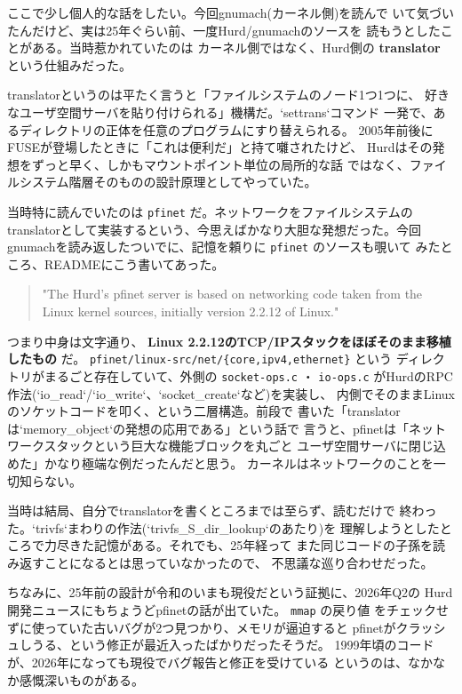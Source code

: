 \documentclass[11pt]{article}
\begin{document}
ここで少し個人的な話をしたい。今回gnumach(カーネル側)を読んで
いて気づいたんだけど、実は25年ぐらい前、一度Hurd/gnumachのソースを
読もうとしたことがある。当時惹かれていたのは
カーネル側ではなく、Hurd側の \textbf{translator} という仕組みだった。

translatorというのは平たく言うと「ファイルシステムのノード1つ1つに、
好きなユーザ空間サーバを貼り付けられる」機構だ。`settrans`コマンド
一発で、あるディレクトリの正体を任意のプログラムにすり替えられる。
2005年前後にFUSEが登場したときに「これは便利だ」と持て囃されたけど、
Hurdはその発想をずっと早く、しかもマウントポイント単位の局所的な話
ではなく、ファイルシステム階層そのものの設計原理としてやっていた。

当時特に読んでいたのは \texttt{pfinet} だ。ネットワークをファイルシステムの
translatorとして実装するという、今思えばかなり大胆な発想だった。今回
gnumachを読み返したついでに、記憶を頼りに \texttt{pfinet} のソースも覗いて
みたところ、READMEにこう書いてあった。

\begin{quote}
"The Hurd's pfinet server is based on networking code taken from the
Linux kernel sources, initially version 2.2.12 of Linux."
\end{quote}

つまり中身は文字通り、 \textbf{Linux 2.2.12のTCP/IPスタックをほぼそのまま移植したもの} だ。
\texttt{pfinet/linux-src/net/\{core,ipv4,ethernet\}} という
ディレクトリがまるごと存在していて、外側の \texttt{socket-ops.c} ・ \texttt{io-ops.c}
がHurdのRPC作法(`io\_read`/`io\_write`、`socket\_create`など)を実装し、
内側でそのままLinuxのソケットコードを叩く、という二層構造。前段で
書いた「translatorは`memory\_object`の発想の応用である」という話で
言うと、pfinetは「ネットワークスタックという巨大な機能ブロックを丸ごと
ユーザ空間サーバに閉じ込めた」かなり極端な例だったんだと思う。
カーネルはネットワークのことを一切知らない。

当時は結局、自分でtranslatorを書くところまでは至らず、読むだけで
終わった。`trivfs`まわりの作法(`trivfs\_S\_dir\_lookup`のあたり)を
理解しようとしたところで力尽きた記憶がある。それでも、25年経って
また同じコードの子孫を読み返すことになるとは思っていなかったので、
不思議な巡り合わせだった。

ちなみに、25年前の設計が令和のいまも現役だという証拠に、2026年Q2の
Hurd開発ニュースにもちょうどpfinetの話が出ていた。 \texttt{mmap} の戻り値
をチェックせずに使っていた古いバグが2つ見つかり、メモリが逼迫すると
pfinetがクラッシュしうる、という修正が最近入ったばかりだったそうだ。
1999年頃のコードが、2026年になっても現役でバグ報告と修正を受けている
というのは、なかなか感慨深いものがある。
\end{document}
